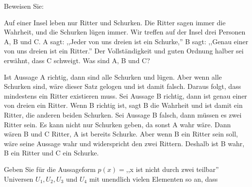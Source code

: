 \documentclass[10pt, a4paper]{exam}
\begin{document}
\begin{questions}
    \question Beweisen Sie:

    \question Auf einer Insel leben nur Ritter und Schurken. Die Ritter sagen immer die Wahrheit, und die Schurken lügen immer. Wir treffen auf der Insel drei Personen A, B und C. A sagt: ,,Jeder von uns dreien ist ein Schurke,'' B sagt: ,,Genau einer von uns dreien ist ein Ritter.'' Der Vollständigkeit und guten Ordnung halber sei erwähnt, dass C schweigt. Was sind A, B und C?
    \begin{solution}
        Ist Aussage A richtig, dann sind alle Schurken und lügen. Aber wenn alle Schurken sind, wäre dieser Satz gelogen und ist damit falsch. Daraus folgt, dass mindestens ein Ritter existieren muss.
        Sei Aussage B richtig, dann ist genau einer von dreien ein Ritter. Wenn B richtig ist, sagt B die Wahrheit und ist damit ein Ritter, die anderen beiden Schurken.
        Sei Aussage B falsch, dann müssen es zwei Ritter sein. Es kann nicht nur Schurken geben, da sonst A wahr wäre. Dann wären B und C Ritter, A ist bereits Schurke. Aber wenn B ein Ritter sein soll, wäre seine Aussage wahr und widerspricht den zwei Rittern.
        Deshalb ist B wahr, B ein Ritter und C ein Schurke.
    \end{solution}

    \question Geben Sie für die Aussageform $p(x) = $,,x ist nicht durch zwei teilbar'' Universen $U_1,U_2,U_3$ und $U_4$ mit unendlich vielen Elementen so an, dass
    \begin{parts}

\end{parts}
\end{questions}
\end{document}
